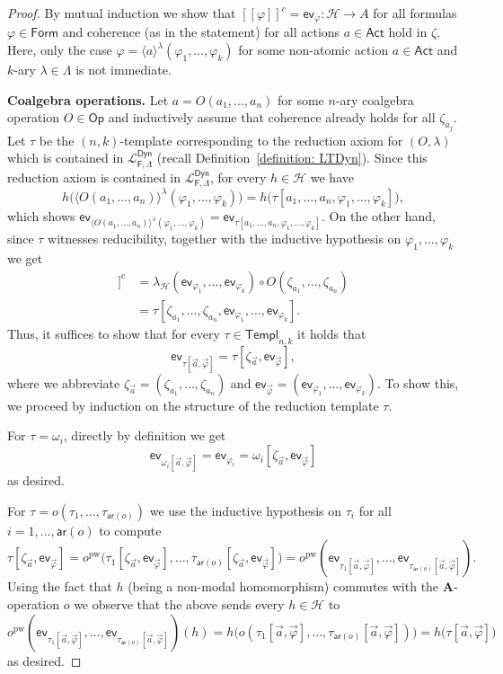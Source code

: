 \documentclass[10pt,a4paper]{amsart}
\newcommand{\Act}{\mathsf{Act}}
\newcommand{\CoOp}{\mathsf{Op}}
\newcommand{\Formu}{\mathsf{Form}}
\newcommand{\LTDyn}{\mathcal{L}_{\func{F}, \Pred}^\mathsf{Dyn}}
\newcommand{\NMH}{\mathcal{H}}
\newcommand{\Pred}{\Lambda}
\newcommand{\alg}[1]{\mathbf{#1}}
\newcommand{\arity}{\mathsf{ar}}
\newcommand{\diam}[1]{\langle {#1} \rangle}
\newcommand{\ev}{\mathsf{ev}}
\newcommand{\func}[1]{\mathsf{#1}}
\newcommand{\nkTempl}{\mathsf{Templ}_{n,k}}
\newcommand{\sem}[1]{[\![{#1}]\!]}
\begin{document}
\begin{proof}
By mutual induction we show that $\sem{\varphi}^c = \ev_{\varphi} \colon \NMH \to A$ for all formulas $\varphi \in \Formu$ and coherence (as in the statement) for all actions $a \in \Act$ hold in $\zeta$. Here, only the case $\varphi = \diam{a}^\lambda (\varphi_1, \dots, \varphi_k)$ for some non-atomic action $a \in \Act$ and $k$-ary $\lambda \in \Pred$ is not immediate.  

\textbf{Coalgebra operations.} Let $a = O(a_1, \dots ,a_n)$ for some $n$-ary coalgebra operation $O \in \CoOp$ and inductively assume that coherence already holds for all $\zeta_{a_j}$. Let $\tau$ be the $(n,k)$-template corresponding to the reduction axiom for $(O, \lambda)$ which is contained in $\LTDyn$ (recall Definition~\ref{definition: LTDyn}). Since this reduction axiom is contained in $\LTDyn$, for every $h \in \NMH$ we have  
$$
h\big(\diam{O(a_1, \dots, a_n)}^\lambda (\varphi_1, \dots, \varphi_k)\big) = h\big(\tau[a_1, \dots, a_n, \varphi_1, \dots, \varphi_k]\big),$$ 
which shows $\ev_{\diam{O(a_1, \dots, a_n)}^\lambda (\varphi_1, \dots, \varphi_k)} = \ev_{\tau[a_1, \dots, a_n, \varphi_1, \dots, \varphi_k]}$. On the other hand, since $\tau$ witnesses reducibility, together with the inductive hypothesis on $\varphi_1, \dots, \varphi_k$ we get 
\begin{align*}
\sem{\diam{O(a_1, \dots, a_n)}^\lambda (\varphi_1, \dots, \varphi_k)}^\mathrm{c} & = \lambda_\NMH (\ev_{\varphi_1}, \dots, \ev_{\varphi_k}) \circ O(\zeta_{a_1}, \dots, \zeta_{a_n}) \\ 
& = \tau[\zeta_{a_1}, \dots, \zeta_{a_n}, \ev_{\varphi_1}, \dots, \ev_{\varphi_k}].
\end{align*}
Thus, it suffices to show that for every $\tau \in \nkTempl$ it holds that 
$$\ev_{\tau[\vec{a}, \vec{\varphi}]} = \tau[\zeta_{\vec{a}}, \ev_{\vec{\varphi}}],$$  
where we abbreviate $\zeta_{\vec{a}} = (\zeta_{a_1}, \dots, \zeta_{a_n})$ and $\ev_{\vec{\varphi}} = (\ev_{\varphi_1}, \dots, \ev_{\varphi_k})$. To show this, we proceed by induction on the structure of the reduction template $\tau$. 

For $\tau = \omega_i$, directly by definition we get 
$$
\ev_{\omega_i[\vec{a}, \vec{\varphi}]} = \ev_{\varphi_i} = \omega_i[\zeta_{\vec{a}}, \ev_{\vec{\varphi}}]
$$
as desired.

For $\tau = o(\tau_1 , \dots, \tau_{\arity(o)})$ we use the inductive hypothesis on $\tau_i$ for all $i = 1, \dots, \arity(o)$ to compute
$$
\tau[\zeta_{\vec{a}}, \ev_{\vec{\varphi}}] = o^\mathrm{pw} \big(\tau_1[\zeta_{\vec{a}}, \ev_{\vec{\varphi}}], \dots, \tau_{\arity(o)}[\zeta_{\vec{a}}, \ev_{\vec{\varphi}}]\big) = o^\mathrm{pw}(\ev_{\tau_1[\vec{a}, \vec{\varphi}]}, \dots, \ev_{\tau_{\arity(o)}[\vec{a}, \vec{\varphi}]}).
$$
Using the fact that $h$ (being a non-modal homomorphism) commutes with the $\alg{A}$-operation $o$ we observe that the above sends every $h \in \NMH$ to  
$$
o^\mathrm{pw}(\ev_{\tau_1[\vec{a}, \vec{\varphi}]}, \dots, \ev_{\tau_{\arity(o)}[\vec{a}, \vec{\varphi}]})(h) = h\big (o(\tau_1[\vec{a}, \vec{\varphi}], \dots, \tau_{\arity(o)}[\vec{a}, \vec{\varphi}]) \big) = h\big(\tau[\vec{a}, \vec{\varphi}]\big)
$$
as desired. 


\end{proof}
\end{document}
